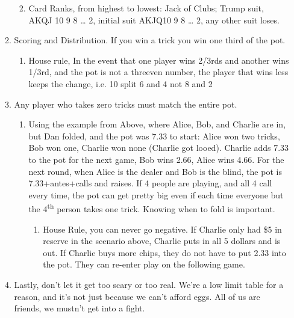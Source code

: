 \documentclass[
]{article}
\begin{document}
\begin{enumerate}
\begin{enumerate}
    \begin{enumerate}
    \def\labelenumiii{\roman{enumiii}.}
    \item
      Card Ranks, from highest to lowest: Jack of Clubs; Trump suit,
      AKQJ 10 9 8 \ldots{} 2, initial suit AKJQ10 9 8 \ldots{} 2, any
      other suit loses.
    \end{enumerate}
  \item
    Scoring and Distribution. If you win a trick you win one third of
    the pot.

    \begin{enumerate}
    \def\labelenumiii{\roman{enumiii}.}
    \item
      House rule, In the event that one player wins 2/3rds and another
      wins 1/3rd, and the pot is not a threeven number, the player that
      wins less keeps the change, i.e. 10 split 6 and 4 not 8 and 2
    \end{enumerate}
  \item
    Any player who takes zero tricks must match the entire pot.

    \begin{enumerate}
    \def\labelenumiii{\roman{enumiii}.}
    \item
      Using the example from Above, where Alice, Bob, and Charlie are
      in, but Dan folded, and the pot was 7.33 to start: Alice won two
      tricks, Bob won one, Charlie won none (Charlie got looed). Charlie
      adds 7.33 to the pot for the next game, Bob wins 2.66, Alice wins
      4.66. For the next round, when Alice is the dealer and Bob is the
      blind, the pot is 7.33+antes+calls and raises. If 4 people are
      playing, and all 4 call every time, the pot can get pretty big
      even if each time everyone but the 4\textsuperscript{th} person
      takes one trick. Knowing when to fold is important.

      \begin{enumerate}
      \def\labelenumiv{\arabic{enumiv}.}
      \item
        House Rule, you can never go negative. If Charlie only had \$5
        in reserve in the scenario above, Charlie puts in all 5 dollars
        and is out. If Charlie buys more chips, they do not have to put
        2.33 into the pot. They can re-enter play on the following game.
      \end{enumerate}
    \end{enumerate}
  \item
    Lastly, don't let it get too scary or too real. We're a low limit
    table for a reason, and it's not just because we can't afford eggs.
    All of us are friends, we mustn't get into a fight.
  \end{enumerate}
\end{enumerate}
\end{document}
